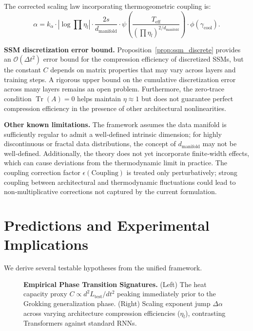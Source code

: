 \documentclass[11pt, a4paper]{article}
\theoremstyle{plain}
\DeclareMathOperator{\Tr}{Tr}
\begin{document}
The corrected scaling law incorporating thermogeometric coupling is:
\[
\alpha = k_\alpha \cdot |\log\prod\eta_l| \cdot \frac{2s}{d_{\text{manifold}}} \cdot \psi\left(\frac{T_{\text{eff}}}{(\prod\eta_l)^{2/d_{\text{manifold}}}}\right) \cdot \phi(\gamma_{\text{cool}}).
\]

\textbf{SSM discretization error bound.} Proposition~\ref{prop:ssm_discrete} provides an $\mathcal{O}(\Delta t^2)$ error bound for the compression efficiency of discretized SSMs, but the constant $C$ depends on matrix properties that may vary across layers and training steps. A rigorous upper bound on the cumulative discretization error across many layers remains an open problem. Furthermore, the zero‑trace condition $\Tr(A)=0$ helps maintain $\eta\approx1$ but does not guarantee perfect compression efficiency in the presence of other architectural nonlinearities.

\textbf{Other known limitations.} The framework assumes the data manifold is sufficiently regular to admit a well‑defined intrinsic dimension; for highly discontinuous or fractal data distributions, the concept of $d_{\text{manifold}}$ may not be well‑defined. Additionally, the theory does not yet incorporate finite‑width effects, which can cause deviations from the thermodynamic limit in practice. The coupling correction factor $\epsilon(\text{Coupling})$ is treated only perturbatively; strong coupling between architectural and thermodynamic fluctuations could lead to non‑multiplicative corrections not captured by the current formulation.

\section{Predictions and Experimental Implications}

We derive several testable hypotheses from the unified framework.

\begin{figure}[htbp]
    \centering
    \vspace{4cm} %
    \caption{\textbf{Empirical Phase Transition Signatures.} (Left) The heat capacity proxy $C \propto d^2L_{\text{test}}/dt^2$ peaking immediately prior to the Grokking generalization phase. (Right) Scaling exponent jump $\Delta\alpha$ across varying architecture compression efficiencies ($\eta_l$), contrasting Transformers against standard RNNs.}
    \label{fig:empirical_validation}
\end{figure}
\end{document}
